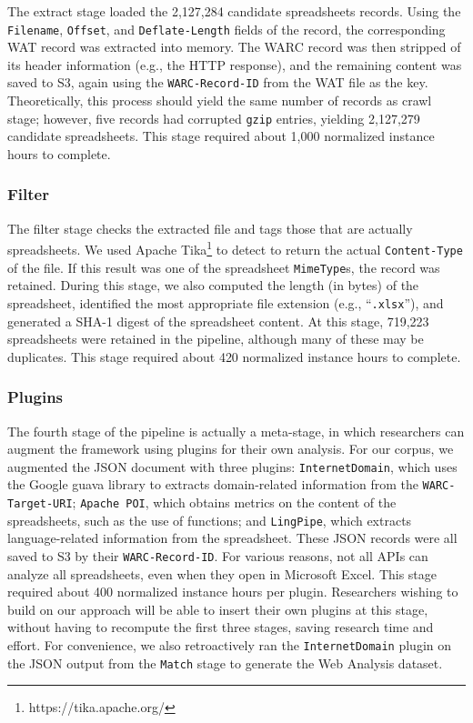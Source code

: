 \documentclass[conference]{IEEEtran}
\begin{document}
The extract stage loaded the 2,127,284 candidate spreadsheets records. Using the \texttt{Filename}, \texttt{Offset}, and \texttt{Deflate-Length} fields of the record, the corresponding WAT record was extracted into memory. The WARC record was then stripped of its header information (e.g., the HTTP response), and the remaining content was saved to S3, again using the \texttt{WARC-Record-ID} from the WAT file as the key. Theoretically, this process should yield the same number of records as crawl stage; however, five records had corrupted \texttt{gzip} entries, yielding 2,127,279 candidate spreadsheets. This stage required about 1,000 normalized instance hours to complete.

\subsubsection{Filter} 

The filter stage checks the extracted file and tags those that are actually spreadsheets. We used Apache Tika\footnote{https://tika.apache.org/} to detect to return the actual \texttt{Content-Type} of the file. If this result was one of the spreadsheet \texttt{MimeType}s, the record was retained. During this stage, we also computed the length (in bytes) of the spreadsheet, identified the most appropriate file extension (e.g., ``\texttt{.xlsx}''), and generated a SHA-1 digest of the spreadsheet content.  At this stage, 719,223 spreadsheets were retained in the pipeline, although many of these may be duplicates. This stage required about 420 normalized instance hours to complete.

\subsubsection{Plugins} 

The fourth stage of the pipeline is actually a meta-stage, in which researchers can augment the framework using plugins for their own analysis. For our corpus, we augmented the JSON document with three plugins: \texttt{InternetDomain}, which uses the Google guava library to extracts domain-related information from the \texttt{WARC-Target-URI}; \texttt{Apache POI}, which obtains metrics on the content of the spreadsheets, such as the use of functions; and \texttt{LingPipe}, which extracts language-related information from the spreadsheet. These JSON records were all saved to S3 by their \texttt{WARC-Record-ID}. For various reasons, not all APIs can analyze all spreadsheets, even when they open in Microsoft Excel. This stage required about 400 normalized instance hours per plugin. Researchers wishing to build on our approach will be able to insert their own plugins at this stage, without having to recompute the first three stages, saving research time and effort. For convenience, we also retroactively ran the \texttt{InternetDomain} plugin on the JSON output from the \texttt{Match} stage to generate the Web Analysis dataset.
\end{document}
